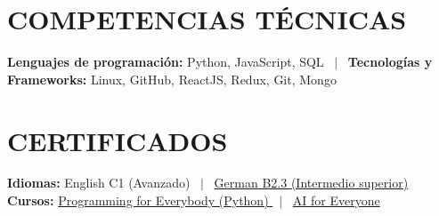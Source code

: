 \documentclass[letterpaper,11pt]{article}
\newif\ifeng
\newcommand{\lang}[2]{\ifeng #1\else #2\fi}
\begin{document}
\section{\lang{TECHNICAL SKILLS}{COMPETENCIAS TÉCNICAS}}
\vspace{2pt}
\small{
    \textbf{\lang{Programming Languages:}{Lenguajes de programación:}} Python, JavaScript, SQL \ $|$ \ 
    \textbf{\lang{Technologies \& Frameworks:}{Tecnologías y Frameworks:}} Linux, GitHub, ReactJS, Redux, Git, Mongo
}

\section{\lang{CERTIFICATIONS}{CERTIFICADOS}}
\vspace{2pt}
\small{
    \textbf{\lang{Languages:}{Idiomas:}} English C1 (\lang{Advanced}{Avanzado}) \ $|$ \ \href{https://mail-attachment.googleusercontent.com/attachment/u/0/?ui=2&ik=8d20ed44f3&attid=0.1&permmsgid=msg-f:1693071186489855303&th=177eff461a2d4d47&view=att&disp=inline&sadnir=1&saddbat=ANGjdJ9Lh1VqjCmpeqBNAWEgCTelW-va_t57iChTnmJUeFpW-t8Q1dT2uk1hpgU50ZZ1bwf4eJDgy2es1ZtdmigVraf3uLlOBCtByq5Ht4iYY01MzWurxZzv3MgXkeOotkxnxFIxEk8FeTJUDBbuw0KCsHkFpQfR157c-OC1CHjWgdAd7Cd2YgkbLTj4GC9-1_4KgNRHJO7KrXGHKVQ74YIBGqN9S0lDGaLPoFxNKfstqueW-5YgvUkfC8H1_Q0p4nWtyuaOfnEivD2GBMrQrJfM3UiPP5E4-x_sdGUqrnrE8fx0zmvn9cUgQhCdgNBKb342zyxfXJgXDnbFZMV-yGxDWizQaYmYVvA3hzm_s9-OcpcbQrmIjcV-wrRWaq8pE0atAfP67eX2bAeLFGfnfJP7HoZ73McNzTxIyLypXV-V0LwasipVlUdcggFfGvFZV0SuA54cKbu1NwbIcXleSuiTsb_UnIQoDyWxP7iPyCGSusjoKpB6K5CJrK8TyLrl2gZmz9BLoKzSi-P1Ckqgj7ckNeVWD39tx5bhNbiP6ymb3JjkARRy2ayypVPfSQrE9wP25VYrm2vUf360p31GWQNribW_whUh6TS6JsjGE_WYQKiX374a-gzd-O7Jp4c0au8Tg_UXIP5i7spHuIY8_uotKQ7Y-c_kPYb3wNT1m6n2WeCFlC67yLw5NXpItfY}{German B2.3 (\lang{Upper Intermediate}{Intermedio superior}) \faExternalLink} \\
    \textbf{\lang{Courses:}{Cursos:}} \href{https://coursera.org/share/fc962a1faf7e9f1be188756a01ab2257}{Programming for Everybody (Python) \faExternalLink} \ $|$ \ \href{https://coursera.org/share/a0be561a2929fe035a71fe0618ab498e}{AI for Everyone \faExternalLink}
}
\end{document}
